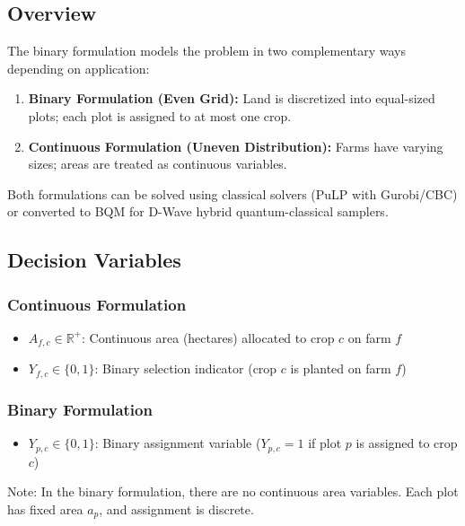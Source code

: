 \documentclass[11pt,a4paper]{article}
\begin{document}
\subsection{Overview}

The binary formulation models the problem in two complementary ways depending on application:

\begin{enumerate}
    \item \textbf{Binary Formulation (Even Grid):} Land is discretized into equal-sized plots; each plot is assigned to at most one crop.
    \item \textbf{Continuous Formulation (Uneven Distribution):} Farms have varying sizes; areas are treated as continuous variables.
\end{enumerate}

Both formulations can be solved using classical solvers (PuLP with Gurobi/CBC) or converted to BQM for D-Wave hybrid quantum-classical samplers.

\subsection{Decision Variables}

\subsubsection{Continuous Formulation}

\begin{itemize}
    \item $A_{f,c} \in \mathbb{R}^+$: Continuous area (hectares) allocated to crop $c$ on farm $f$
    \item $Y_{f,c} \in \{0,1\}$: Binary selection indicator (crop $c$ is planted on farm $f$)
\end{itemize}

\subsubsection{Binary Formulation}

\begin{itemize}
    \item $Y_{p,c} \in \{0,1\}$: Binary assignment variable ($Y_{p,c}=1$ if plot $p$ is assigned to crop $c$)
\end{itemize}

Note: In the binary formulation, there are no continuous area variables. Each plot has fixed area $a_p$, and assignment is discrete.
\end{document}
